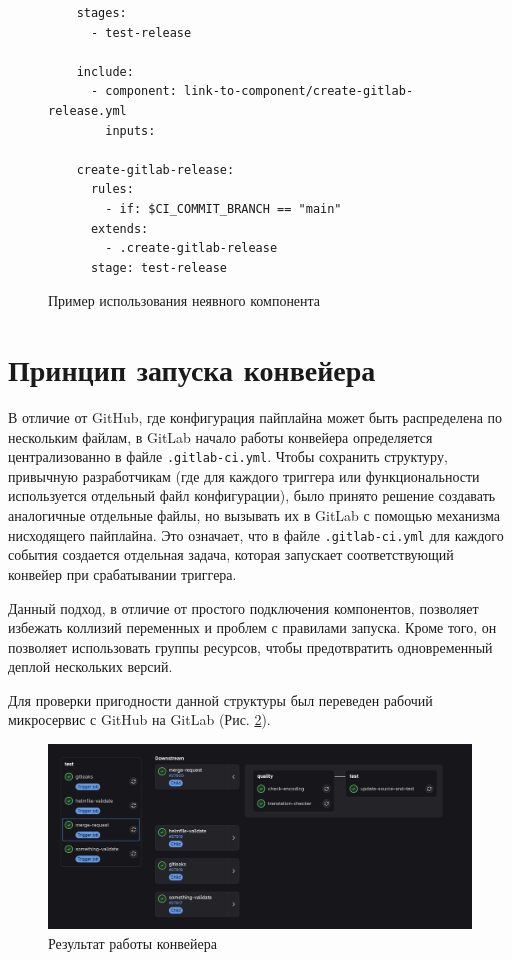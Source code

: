 \begin{figure}
  \centering
  \scriptsize
  \begin{verbatim}
    stages:
      - test-release

    include:
      - component: link-to-component/create-gitlab-release.yml
        inputs:

    create-gitlab-release:
      rules:
        - if: $CI_COMMIT_BRANCH == "main"
      extends:
        - .create-gitlab-release
      stage: test-release
  \end{verbatim}
  \caption{Пример использования неявного компонента}
  \label{fig:implicit-component-code-usage}
\end{figure}


\section{Принцип запуска конвейера} \label{sec:pipeline-run-principal}
В отличие от GitHub, где конфигурация пайплайна может быть распределена по нескольким файлам,
в GitLab начало работы конвейера определяется централизованно в файле \texttt{.gitlab-ci.yml}.
Чтобы сохранить структуру, привычную разработчикам (где для каждого триггера или функциональности используется отдельный файл конфигурации),
было принято решение создавать аналогичные отдельные файлы,
но вызывать их в GitLab с помощью механизма нисходящего пайплайна.
Это означает, что в файле \texttt{.gitlab-ci.yml} для каждого события создается отдельная задача,
которая запускает соответствующий конвейер при срабатывании триггера.

Данный подход, в отличие от простого подключения компонентов, позволяет избежать коллизий переменных и проблем с правилами запуска.
Кроме того, он позволяет использовать группы ресурсов, чтобы предотвратить одновременный деплой нескольких версий.

Для проверки пригодности данной структуры был переведен рабочий микросервис с GitHub на GitLab (Рис. \ref{fig:pipeline-run-result}).

\begin{figure}[H]
  \centering
  \includegraphics[width=16cm]{img/pipeline-run-result}
  \caption{Результат работы конвейера}
  \label{fig:pipeline-run-result}
\end{figure}

